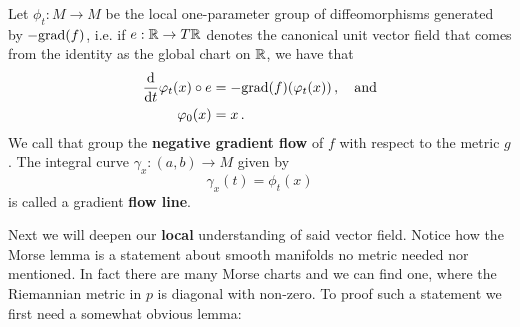 \begin{definition}
Let $\phi_t:M\to M$ be the local one-parameter group of diffeomorphisms generated by $-\mathrm{grad}(f)$, i.e. if $e:\mathbb{R}\to T\mathbb{R}$ denotes the canonical unit vector field that comes from the identity as the global chart on $\mathbb{R}$, we have that 
\begin{align*}
\frac{\mathop{}\!\mathrm{d}}{\mathop{}\!\mathrm{d} t} \varphi_t(x)\circ e
	&= -\mathrm{grad}(f)(\varphi_t(x))\, , \quad \text{and}\\
	\varphi_0(x)&=x\, .
\end{align*} We call that group the \textbf{negative gradient flow} of $f$ with respect to the metric $g$. 
The integral curve $\gamma_x:(a,b)\to M$ given by
\begin{equation*}
	\gamma_x(t)=\phi_t(x)
\end{equation*} is called a gradient \textbf{flow line}.
\end{definition}

Next we will deepen our \textbf{local} understanding of said vector field. Notice how the Morse lemma is a statement about smooth manifolds no metric needed nor mentioned. In fact there are many Morse charts and we can find one, where the Riemannian metric in $p$ is diagonal with non-zero. To proof such a statement we first need a somewhat obvious lemma:

